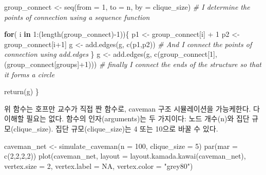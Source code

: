 \documentclass[
]{book}
\newenvironment{Shaded}{\begin{snugshade}}{\end{snugshade}}
\newcommand{\AttributeTok}[1]{\textcolor[rgb]{0.77,0.63,0.00}{#1}}
\newcommand{\CommentTok}[1]{\textcolor[rgb]{0.56,0.35,0.01}{\textit{#1}}}
\newcommand{\ConstantTok}[1]{\textcolor[rgb]{0.00,0.00,0.00}{#1}}
\newcommand{\ControlFlowTok}[1]{\textcolor[rgb]{0.13,0.29,0.53}{\textbf{#1}}}
\newcommand{\DecValTok}[1]{\textcolor[rgb]{0.00,0.00,0.81}{#1}}
\newcommand{\FunctionTok}[1]{\textcolor[rgb]{0.00,0.00,0.00}{#1}}
\newcommand{\NormalTok}[1]{#1}
\newcommand{\OtherTok}[1]{\textcolor[rgb]{0.56,0.35,0.01}{#1}}
\newcommand{\SpecialCharTok}[1]{\textcolor[rgb]{0.00,0.00,0.00}{#1}}
\newcommand{\StringTok}[1]{\textcolor[rgb]{0.31,0.60,0.02}{#1}}
\begin{document}
\begin{Shaded}
\begin{Highlighting}[]
\NormalTok{  group\_connect }\OtherTok{\textless{}{-}} \FunctionTok{seq}\NormalTok{(}\AttributeTok{from =} \DecValTok{1}\NormalTok{, }\AttributeTok{to =}\NormalTok{ n, }\AttributeTok{by =}\NormalTok{ clique\_size) }\CommentTok{\# I determine the points of connection using a sequence function}
  
  \ControlFlowTok{for}\NormalTok{( i }\ControlFlowTok{in} \DecValTok{1}\SpecialCharTok{:}\NormalTok{(}\FunctionTok{length}\NormalTok{(group\_connect)}\SpecialCharTok{{-}}\DecValTok{1}\NormalTok{))\{}
\NormalTok{    p1 }\OtherTok{\textless{}{-}}\NormalTok{ group\_connect[i] }\SpecialCharTok{+} \DecValTok{1}
\NormalTok{    p2 }\OtherTok{\textless{}{-}}\NormalTok{ group\_connect[i}\SpecialCharTok{+}\DecValTok{1}\NormalTok{]}
\NormalTok{    g }\OtherTok{\textless{}{-}} \FunctionTok{add.edges}\NormalTok{(g, }\FunctionTok{c}\NormalTok{(p1,p2)) }\CommentTok{\# And I connect the points of connection using add.edges}
\NormalTok{  \}}
\NormalTok{    g }\OtherTok{\textless{}{-}} \FunctionTok{add.edges}\NormalTok{(g, }\FunctionTok{c}\NormalTok{(group\_connect[}\DecValTok{1}\NormalTok{],(group\_connect[groups]}\SpecialCharTok{+}\DecValTok{1}\NormalTok{))) }\CommentTok{\# finally I connect the ends of the structure so that it forms a circle}

    \FunctionTok{return}\NormalTok{(g)    }
\NormalTok{\} }
\end{Highlighting}
\end{Shaded}

위 함수는 호프만 교수가 직접 짠 함수로, caveman 구조 시뮬레이션을 가능케한다. 다 이해할 필요는 없다. 함수의 인자(arguments)는 두 가지이다: 노드 개수(n)와 집단 규모(clique\_size). 집단 규모(clique\_size)는 4 또는 10으로 바꿀 수 있다.

\begin{Shaded}
\begin{Highlighting}[]
\NormalTok{caveman\_net }\OtherTok{\textless{}{-}} \FunctionTok{simulate\_caveman}\NormalTok{(}\AttributeTok{n =} \DecValTok{100}\NormalTok{, }\AttributeTok{clique\_size =} \DecValTok{5}\NormalTok{) }
\FunctionTok{par}\NormalTok{(}\AttributeTok{mar =} \FunctionTok{c}\NormalTok{(}\DecValTok{2}\NormalTok{,}\DecValTok{2}\NormalTok{,}\DecValTok{2}\NormalTok{,}\DecValTok{2}\NormalTok{))}
\FunctionTok{plot}\NormalTok{(caveman\_net, }\AttributeTok{layout =} \FunctionTok{layout.kamada.kawai}\NormalTok{(caveman\_net), }\AttributeTok{vertex.size =} \DecValTok{2}\NormalTok{, }\AttributeTok{vertex.label =} \ConstantTok{NA}\NormalTok{, }\AttributeTok{vertex.color =} \StringTok{"grey80"}\NormalTok{)}
\end{Highlighting}
\end{Shaded}
\end{document}

